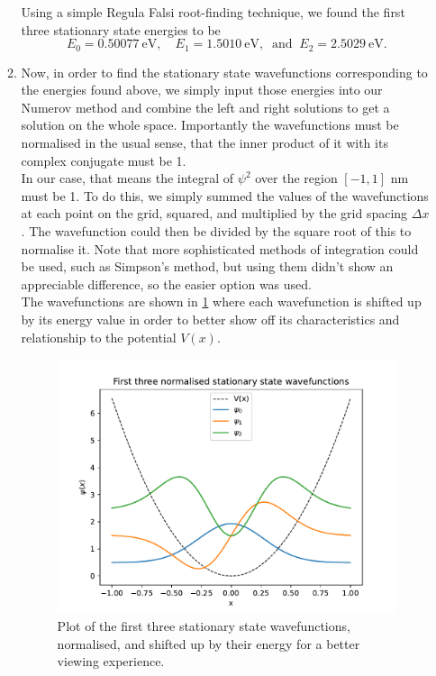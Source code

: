 \documentclass[11pt]{article}
\begin{document}
\begin{enumerate}
\begin{enumerate}
        Using a simple Regula Falsi root-finding technique, we found the first three stationary state energies to be 
        \begin{equation*}
            E_0=\SI{0.50077}{\electronvolt},\quad E_1=\SI{1.5010}{\electronvolt},\;\;\mathrm{and}\;\; E_2=\SI{2.5029}{\electronvolt}.
        \end{equation*}
        
        \item Now, in order to find the stationary state wavefunctions corresponding to the energies found above, we simply input those energies into our Numerov method and combine the left and right solutions to get a solution on the whole space. Importantly the wavefunctions must be normalised in the usual sense, that the inner product of it with its complex conjugate must be 1.\\
        In our case, that means the integral of $\psi^2$ over the region $[-1,1]$ nm must be 1. To do this, we simply summed the values of the wavefunctions at each point on the grid, squared, and multiplied by the grid spacing $\Delta x$. The wavefunction could then be divided by the square root of this to normalise it. Note that more sophisticated methods of integration could be used, such as Simpson's method, but using them didn't show an appreciable difference, so the easier option was used.\\
        The wavefunctions are shown in \cref{fig:q2b} where each wavefunction is shifted up by its energy value in order to better show off its characteristics and relationship to the potential $V(x)$. 


        \begin{figure}[h]
            \begin{center}
                \includegraphics[width=.6\textwidth]{Plots/q2b.pdf}
                \caption{Plot of the first three stationary state wavefunctions, normalised, and shifted up by their energy for a better viewing experience. }
                \label{fig:q2b}
            \end{center}
        \end{figure}
        

\end{enumerate}
\end{enumerate}
\end{document}
